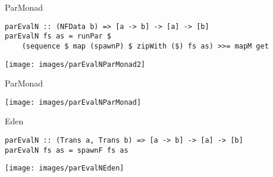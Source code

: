 \begin{frame}[fragile]{ParMonad}
\begin{lstlisting}[frame=htrbl]
parEvalN :: (NFData b) => [a -> b] -> [a] -> [b]
parEvalN fs as = runPar $ 
	(sequence $ map (spawnP) $ zipWith ($) fs as) >>= mapM get
\end{lstlisting}
\begin{center}
	\texttt{[image: images/parEvalNParMonad2]}
\end{center}
\end{frame}

\begin{frame}[fragile]{ParMonad}
\begin{center}
	\texttt{[image: images/parEvalNParMonad]}
\end{center}
\end{frame}

\begin{frame}[fragile]{Eden}
\begin{lstlisting}[frame=htrbl]
parEvalN :: (Trans a, Trans b) => [a -> b] -> [a] -> [b]
parEvalN fs as = spawnF fs as
\end{lstlisting}
\begin{center}
\texttt{[image: images/parEvalNEden]}
\end{center}
\end{frame}